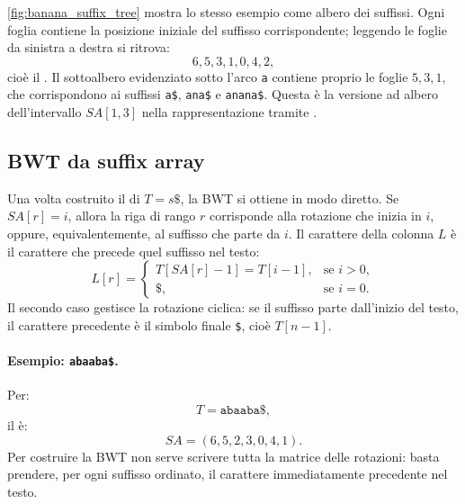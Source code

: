 \documentclass{article}
\theoremstyle{definition}
\numberwithin{equation}{section}
\begin{document}
\autoref{fig:banana_suffix_tree} mostra lo stesso esempio come albero dei suffissi. Ogni foglia contiene la posizione iniziale del suffisso corrispondente; leggendo le foglie da sinistra a destra si ritrova:
\[
    6,5,3,1,0,4,2,
\]
cioè il . Il sottoalbero evidenziato sotto l'arco \texttt{a} contiene proprio le foglie $5,3,1$, che corrispondono ai suffissi \texttt{a\$}, \texttt{ana\$} e \texttt{anana\$}. Questa è la versione ad albero dell'intervallo $SA[1,3]$ nella rappresentazione tramite .

\subsection{BWT da suffix array}
Una volta costruito il  di $T=s\texttt{\$}$, la BWT si ottiene in modo diretto. Se $SA[r]=i$, allora la riga di rango $r$ corrisponde alla rotazione che inizia in $i$, oppure, equivalentemente, al suffisso che parte da $i$. Il carattere della colonna $L$ è il carattere che precede quel suffisso nel testo:
\begin{equation}\label{eq:bwt_from_suffix_array}
    L[r]=
    \begin{cases}
        T[SA[r]-1]=T[i-1], & \text{se } i>0, \\
        \texttt{\$},       & \text{se } i=0.
    \end{cases}
\end{equation}
Il secondo caso gestisce la rotazione ciclica: se il suffisso parte dall'inizio del testo, il carattere precedente è il simbolo finale \texttt{\$}, cioè $T[n-1]$.

\paragraph{Esempio: \texttt{abaaba\$}.}
Per:
\[
    T=\texttt{abaaba\$},
\]
il  è:
\[
    SA=(6,5,2,3,0,4,1).
\]
Per costruire la BWT non serve scrivere tutta la matrice delle rotazioni: basta prendere, per ogni suffisso ordinato, il carattere immediatamente precedente nel testo.
\end{document}

